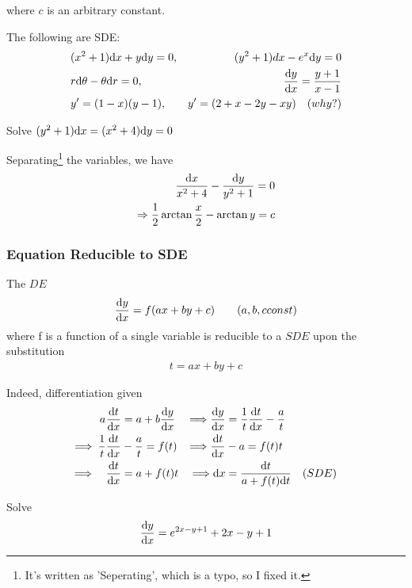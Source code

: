 \documentclass[11pt]{amsbook}
\begin{document}
where $c$ is an arbitrary constant.
\par The following are SDE:
\begin{align*}
	&(x^{2}+1)\mathrm{d}{x} + y\mathrm{d}{y} = 0, &(y^{2}+1)dx - e^{x}\mathrm{d}{y} = 0 \\
	&r\mathrm{d}{\theta} - \theta\mathrm{d}{r} = 0, &\frac{\mathrm{d}{y}}{\mathrm{d}{x}} = \frac{y+1}{x-1} \\
	&y' = (1-x)(y-1), &y' = (2+x-2y-xy) \quad(why?)
\end{align*}
	
\begin{exmp}
	Solve $(y^{2}+1)\mathrm{d}{x} = (x^{2}+4)\mathrm{d}{y} = 0$
	\begin{hSolution}
		Separating\footnote{It's written as 'Seperating', which is a typo, so I fixed it.} the variables, we have
		\begin{align*}
			\frac{\mathrm{d}{x}}{x^{2}+4} - \frac{\mathrm{d}{y}}{y^{2}+1} = 0 \\
			\Rightarrow \frac{1}{2} \arctan{\frac{x}{2}} - \arctan{y} = c
		\end{align*}
	\end{hSolution}
\end{exmp}


\subsubsection{Equation Reducible to SDE}
\label{subsubsec:EquationReducibleToSDE}
The $DE$
\begin{align*}
	\frac{\mathrm{d}{y}}{\mathrm{d}{x}} = f(ax+by+c) \qquad (a, b, c const)
\end{align*}
where f is a function of a single variable is reducible to a $SDE$ upon the substitution
\begin{align*}
	t = ax+by+c
\end{align*}
\par Indeed, differentiation given
\begin{align*}
	{a}^{} \frac{\mathrm{d}{t}}{\mathrm{d}{x}} &= a+b\frac{\mathrm{d}{y}}{\mathrm{d}{x}} &\Longrightarrow \frac{\mathrm{d}{y}}{\mathrm{d}{x}} &= \frac{1}{t}\frac{\mathrm{d}{t}}{\mathrm{d}{x}} - \frac{a}{t} \\
	\Longrightarrow \: \frac{1}{t}\frac{\mathrm{d}{t}}{\mathrm{d}{x}} &- \frac{a}{t} = f(t) &\Longrightarrow \frac{\mathrm{d}{t}}{\mathrm{d}{x}} &- a = f(t)t \\
	\Longrightarrow \quad \frac{\mathrm{d}{t}}{\mathrm{d}{x}} &= a + f(t)t &\Longrightarrow \mathrm{d}{x} &= \frac{\mathrm{d}{t}}{a+f(t)\mathrm{d}{t}} \quad (SDE)
\end{align*}

\begin{exmp}
	Solve
	\[
		\frac{\mathrm{d}{y}}{\mathrm{d}{x}} = e^{2x-y+1} + 2x-y+1
	\]
\end{exmp}
\end{document}
